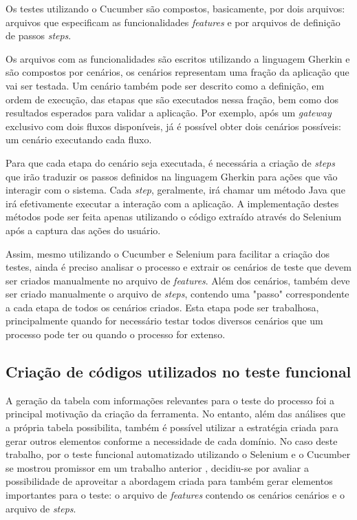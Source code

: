 \documentclass[12pt]{article}
\begin{document}
Os testes utilizando o Cucumber são compostos, basicamente, por dois arquivos: arquivos que especificam as funcionalidades \emph{features} e por arquivos de definição de passos \emph{steps}. 

Os arquivos com as funcionalidades são escritos utilizando a linguagem Gherkin\cite{gherkin} e são compostos por cenários, os cenários representam uma fração da aplicação que vai ser testada. Um cenário também pode ser descrito como a definição, em ordem de execução, das etapas que são executados nessa fração, bem como dos resultados esperados para validar a aplicação. Por exemplo, após um \emph{gateway} exclusivo com dois fluxos disponíveis, já é possível obter dois cenários possíveis: um cenário executando cada fluxo.

Para que cada etapa do cenário seja executada, é necessária a criação de \emph{steps} que irão traduzir os passos definidos na linguagem Gherkin para ações que vão interagir com o sistema. Cada \emph{step}, geralmente, irá chamar um método Java que irá efetivamente executar a interação com a aplicação. A implementação destes métodos pode ser feita apenas utilizando o código extraído através do Selenium após a captura das ações do usuário.

Assim, mesmo utilizando o Cucumber e Selenium para facilitar a criação dos testes, ainda é preciso analisar o processo e extrair os cenários de teste que devem ser criados manualmente no arquivo de \emph{features}. Além dos cenários, também deve ser criado manualmente o arquivo de \emph{steps}, contendo uma "passo" correspondente a cada etapa de todos os cenários criados. Esta etapa pode ser trabalhosa, principalmente quando for necessário testar todos diversos cenários que um processo pode ter ou quando o processo for extenso.

\subsection{Criação de códigos utilizados no teste funcional}
A geração da tabela com informações relevantes para o teste do processo foi a principal motivação da criação da ferramenta. No entanto, além das análises que a própria tabela possibilita, também é possível utilizar a estratégia criada para gerar outros elementos conforme a necessidade de cada domínio. No caso deste trabalho, por o teste funcional automatizado utilizando o Selenium e o Cucumber se mostrou promissor em um trabalho anterior \cite{sbqs2015}, decidiu-se por avaliar a possibilidade de aproveitar a abordagem criada para também gerar elementos importantes para o teste: o arquivo de \emph{features} contendo os cenários cenários e o arquivo de \emph{steps}.
\end{document}
